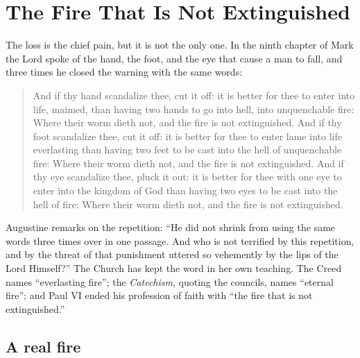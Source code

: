 \section{The Fire That Is Not Extinguished}

The loss is the chief pain, but it is not the only one. In the ninth chapter of Mark the Lord spoke of the hand, the foot, and the eye that cause a man to fall, and three times he closed the warning with the same words:

\begin{quote}
And if thy hand scandalize thee, cut it off: it is better for thee to enter into life, maimed, than having two hands to go into hell, into unquenchable fire: Where their worm dieth not, and the fire is not extinguished. And if thy foot scandalize thee, cut it off: it is better for thee to enter lame into life everlasting than having two feet to be cast into the hell of unquenchable fire: Where their worm dieth not, and the fire is not extinguished. And if thy eye scandalize thee, pluck it out: it is better for thee with one eye to enter into the kingdom of God than having two eyes to be cast into the hell of fire: Where their worm dieth not, and the fire is not extinguished.
\end{quote}

Augustine remarks on the repetition: ``He did not shrink from using the same words three times over in one passage. And who is not terrified by this repetition, and by the threat of that punishment uttered so vehemently by the lips of the Lord Himself?'' The Church has kept the word in her own teaching. The Creed names ``everlasting fire''; the \emph{Catechism}, quoting the councils, names ``eternal fire''; and Paul VI ended his profession of faith with ``the fire that is not extinguished.''

\subsection{A real fire}


